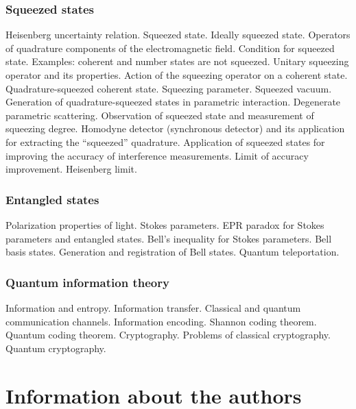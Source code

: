 \subsubsection{Squeezed states}
Heisenberg uncertainty relation. Squeezed state. Ideally squeezed state. Operators of quadrature components of the electromagnetic field. Condition for squeezed state. Examples: coherent and number states are not squeezed. Unitary squeezing operator and its properties. Action of the squeezing operator on a coherent state. Quadrature-squeezed coherent state. Squeezing parameter. Squeezed vacuum. Generation of quadrature-squeezed states in parametric interaction. Degenerate parametric scattering. Observation of squeezed state and measurement of squeezing degree. Homodyne detector (synchronous detector) and its application for extracting the ``squeezed'' quadrature. Application of squeezed states for improving the accuracy of interference measurements. Limit of accuracy improvement. Heisenberg limit.
\subsubsection{Entangled states}
Polarization properties of light. Stokes parameters. EPR paradox for Stokes parameters and entangled states. Bell's inequality for Stokes parameters. Bell basis states. Generation and registration of Bell states. Quantum teleportation.
\subsubsection{Quantum information theory}
Information and entropy. Information transfer. Classical and quantum communication channels. Information encoding. Shannon coding theorem. Quantum coding theorem. Cryptography. Problems of classical cryptography. Quantum cryptography.

\section{Information about the authors}
